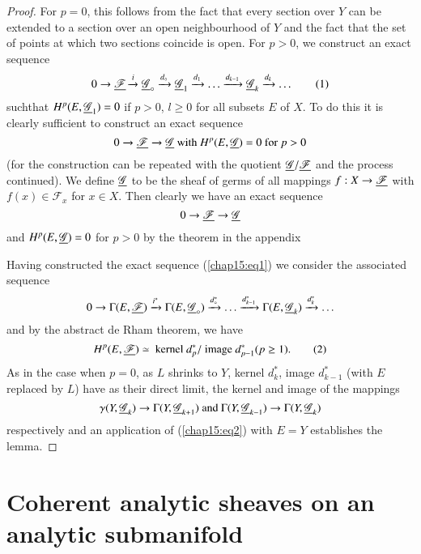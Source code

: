 \begin{proof}
For $p=0$, this follows from the fact that every section over $Y$ can
be extended to a section over an open neighbourhood of $Y$ and the
fact that the set of points at which two sections coincide is
open. For $p>0$, we construct an exact sequence
\begin{equation*}
0 \to \underline{\mathscr{F}} \xrightarrow{i} \underline{\mathscr{G}}_\circ
\xrightarrow{d_\circ} \underline{\mathscr{G}}_1 \xrightarrow{d_1} \ldots
\xrightarrow{d_{k-1}} \underline{\mathscr{G}}_k \xrightarrow{d_k} \ldots 
\tag{1}\label{chap15:eq1}
\end{equation*}
such\pageoriginale that $H^p (E, \underline{\mathscr{G}}_1) = 0$ if $p >0$, $l
\geq 0$ for all subsets $E$ of $X$. To do this it is clearly
sufficient to construct an exact sequence
$$
0 \to \underline{\mathscr{F}} \to \underline{\mathscr{G}} \text{ with } H^p
(E,\underline{\mathscr{G}}) = 0 \text{ for } p > 0
$$
(for the construction can be repeated with the quotient
$\underline{\mathscr{G}}/ \underline{\mathscr{F}}$ and the process continued). We
define $\underline{\mathscr{G}}$ to be the sheaf of germs of all mappings $f :
X \to \underline{\mathscr{F}}$ with $f(x) \in\mathscr{F}_x$ for $x \in
X$. Then clearly we have an exact sequence
$$
0 \to \underline{\mathscr{F}} \to \underline{\mathscr{G}}
$$
and $H^p (E, \underline{\mathscr{G}}) =0$ for $p>0$ by the theorem in the
appendix

Having constructed the exact sequence (\ref{chap15:eq1}) we consider the associated
sequence
$$
0 \to \Gamma (E, \underline{\mathscr{F}}) \xrightarrow{i^\ast} \Gamma (E,
\underline{\mathscr{G}}_\circ) \xrightarrow{d^\ast_\circ}  \ldots
\xrightarrow{d^{\ast}_{k-1}} \Gamma (E, \underline{\mathscr{G}}_k)
\xrightarrow{d^\ast_k} \ldots 
$$
and by the abstract de Rham theorem, we have
\begin{equation*}
H^p (E, \underline{\mathscr{F}}) \simeq \text{ kernel } d^\ast_p / \text{
  image } d^{\ast}_{p-1} (p \geq 1). 
\tag{2}\label{chap15:eq2}
\end{equation*}
As in the case when $p=0$, as $L$ shrinks to $Y$, kernel $d^\ast_k$,
image $d^\ast_{k-1}$ (with $E$ replaced by $L$) have as their direct
limit, the kernel and image of the mappings
$$
\gamma(Y, \underline{\mathscr{G}}_k) \to \Gamma (Y, \underline{\mathscr{G}}_{k+1})
\text{ and } \Gamma (Y, \underline{\mathscr{G}}_{k-1}) \to \Gamma(Y,
\underline{\mathscr{G}}_k)  
$$
respectively and an application of (\ref{chap15:eq2}) with $E =Y$
establishes the lemma. 
\end{proof}

\section{Coherent analytic sheaves on an analytic submanifold}\label{chap15:sec2}

